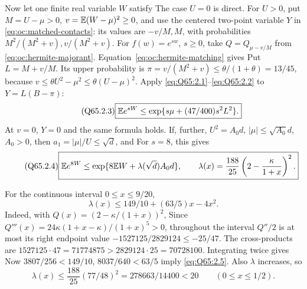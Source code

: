 Now let one finite real variable \(W\) satisfy
The case \(U=\allowbreak 0\) is direct. For \(U>\allowbreak 0\), put
\(M=\allowbreak U-\mu>\allowbreak 0\), \(v=\allowbreak \mathbb E(W-\mu)^2\ge\allowbreak 0\),
and use the centered two-point variable \(Y\) in
\eqref{eq:oc:matched-contacts}: its values are \(-v/M,M\), with
probabilities \(M^2/(M^2+v),v/(M^2+v)\).
For \(f(w)=e^{sw}\), \(s\ge0\), take \(Q=Q_{\mu-v/M}\) from
\eqref{eq:oc:hermite-majorant}. Equation~\eqref{eq:oc:hermite-matching} gives
Put \(L=\allowbreak M+v/M\). Its upper probability is
\(\pi=\allowbreak v/(M^2+v)\le\allowbreak \theta/(1+\theta)=\allowbreak 13/45\), because
\(v\le\allowbreak \theta U^2-\mu^2\le\allowbreak \theta(U-\mu)^2\).
Apply \eqref{eq:Q65:2.1}--\eqref{eq:Q65:2.2} to
\(Y=\allowbreak L(B-\pi)\):
\begin{equation}\tag{Q65.2.3}\label{eq:Q65:2.3}
\boxed{\mathbb E e^{sW}\le\exp\{s\mu+(47/400)s^2L^2\}.}
\end{equation}
At \(v=\allowbreak 0\), \(Y=\allowbreak 0\) and the same formula holds.
If, further, \(U^2=\allowbreak A_0d\), \(|\mu|\le\allowbreak \sqrt{A_0}d\), \(A_0>\allowbreak 0\),
then \(a_1=\allowbreak |\mu|/U\le\allowbreak \sqrt d\), and
For \(s=\allowbreak 8\), this gives
\begin{equation}\tag{Q65.2.4}\label{eq:Q65:2.4}
\boxed{\mathbb E e^{8W}\le
 \exp\{8\mathbb E W+\lambda(\sqrt d)A_0d\},\qquad
\lambda(x)=\frac{188}{25}
 \left(2-\frac{\kappa}{1+x}\right)^2.}
\end{equation}

For the continuous interval \(0\le\allowbreak  x\le\allowbreak 9/20\),
\begin{equation}\tag{Q65.2.5}\label{eq:Q65:2.5}
\boxed{\lambda(x)\le149/10+(63/5)x-4x^2.}
\end{equation}
Indeed, with \(Q(x)=\allowbreak (2-\kappa/(1+x))^2\),
Since \(Q'''(x)=\allowbreak 24\kappa(1+x-\kappa)/(1+x)^5>\allowbreak 0\), throughout
the interval \(Q''/2\) is at most its right endpoint value
\(-1527125/2829124\le\allowbreak -25/47\).
The cross-products are
\(1527125\cdot47=\allowbreak 71774875>\allowbreak 2829124\cdot25=\allowbreak 70728100\).
Integrating twice gives
Now \(3807/256<\allowbreak 149/10\), \(8037/640<\allowbreak 63/5\) imply
\eqref{eq:Q65:2.5}. Also \(\lambda\) increases, so
\begin{equation}\tag{Q65.2.6}\label{eq:Q65:2.6}
\lambda(x)\le\frac{188}{25}(77/48)^2
=278663/14400<20\qquad(0\le x\le1/2).
\end{equation}

